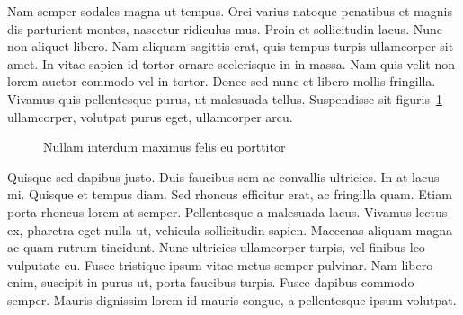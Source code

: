\documentclass[english,masters]{wizthesis}
\begin{document}
Nam semper sodales magna ut tempus. Orci varius natoque penatibus et magnis dis
parturient montes, nascetur ridiculus mus. Proin et sollicitudin lacus. Nunc non
aliquet libero. Nam aliquam sagittis erat, quis tempus turpis ullamcorper sit
amet. In vitae sapien id tortor ornare scelerisque in in massa. Nam quis velit
non lorem auctor commodo vel in tortor. Donec sed nunc et libero mollis
fringilla. Vivamus quis pellentesque purus, ut malesuada tellus. Suspendisse sit
figuris~\ref{fig:wykres} ullamcorper, volutpat purus eget, ullamcorper arcu.
\begin{figure}[ht]
  \centering
  
  \caption{Nullam interdum maximus felis eu porttitor}
  \label{fig:wykres}
\end{figure}
Quisque sed dapibus justo. Duis faucibus sem ac convallis ultricies. In at lacus
mi. Quisque et tempus diam. Sed rhoncus efficitur erat, ac fringilla quam. Etiam
porta rhoncus lorem at semper. Pellentesque a malesuada lacus. Vivamus lectus
ex, pharetra eget nulla ut, vehicula sollicitudin sapien. Maecenas aliquam magna
ac quam rutrum tincidunt. Nunc ultricies ullamcorper turpis, vel finibus leo
vulputate eu. Fusce tristique ipsum vitae metus semper pulvinar. Nam libero
enim, suscipit in purus ut, porta faucibus turpis. Fusce dapibus commodo semper.
Mauris dignissim lorem id mauris congue, a pellentesque ipsum volutpat.
\end{document}
